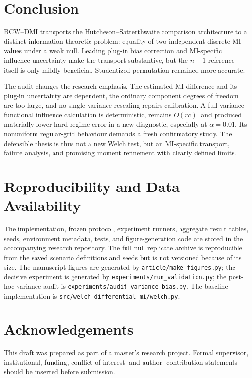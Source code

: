 \documentclass[10pt,twocolumn]{article}
\newcommand{\method}{BCW--DMI}
\begin{document}
\section{Conclusion}

\method{} transports the Hutcheson--Satterthwaite comparison architecture to
a distinct information-theoretic problem: equality of two independent
discrete MI values under a weak null. Leading plug-in bias correction and
MI-specific influence uncertainty make the transport substantive, but the
\(n-1\) reference itself is only mildly beneficial. Studentized permutation
remained more accurate.

The audit changes the research emphasis. The estimated MI difference and its
plug-in uncertainty are dependent, the ordinary component degrees of freedom
are too large, and no single variance rescaling repairs calibration. A full
variance-functional influence calculation is deterministic, remains
\(O(rc)\), and produced materially lower hard-regime error in a new
diagnostic, especially at \(\alpha=0.01\). Its nonuniform regular-grid
behaviour demands a fresh confirmatory study. The defensible thesis is thus
not a new Welch test, but an MI-specific transport, failure analysis, and
promising moment refinement with clearly defined limits.

\section*{Reproducibility and Data Availability}

The implementation, frozen protocol, experiment runners, aggregate result
tables, seeds, environment metadata, tests, and figure-generation code are
stored in the accompanying research repository. The full null replicate
archive is reproducible from the saved scenario definitions and seeds but is
not versioned because of its size. The manuscript figures are generated by
\texttt{article/make\_figures.py}; the decisive experiment is generated by
\texttt{experiments/run\_validation.py}; the post-hoc variance audit is
\texttt{experiments/audit\_variance\_bias.py}. The baseline implementation is
\texttt{src/welch\_differential\_mi/welch.py}.

\section*{Acknowledgements}

This draft was prepared as part of a master's research project. Formal
supervisor, institutional, funding, conflict-of-interest, and author-
contribution statements should be inserted before submission.



\end{document}

